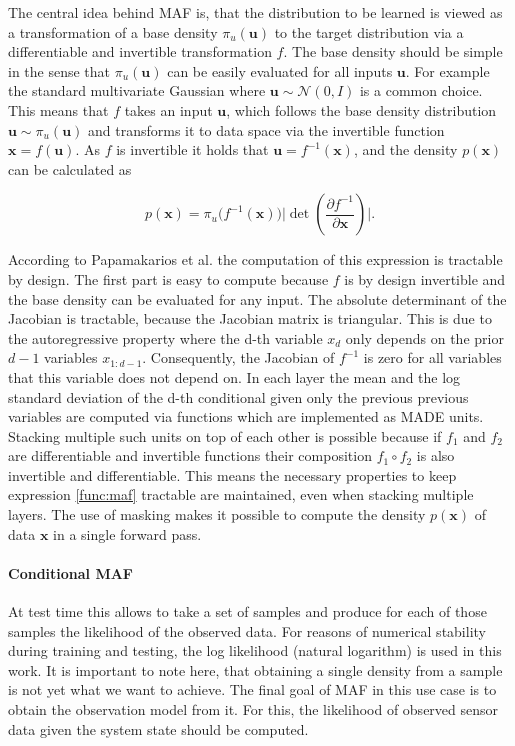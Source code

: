 \documentclass[11pt,titlepage,oneside,openany]{book}
\begin{document}
The central idea behind MAF is, that the distribution to be learned is viewed as a transformation of a base density $\pi_{u} (\pmb{u})$ to the target distribution via a differentiable and invertible transformation $f$. The base density should be simple in the sense that $\pi_{u} (\pmb{u})$ can be easily evaluated for all inputs $\pmb{u}$. For example the standard multivariate Gaussian where $\pmb{u} \sim \mathcal{N}(0, I)$ is a common choice. This means that $f$ takes an input $\pmb{u}$, which follows the base density distribution $\pmb{u} \sim \pi_{u} (\pmb{u})$ and transforms it to data space via the invertible function $\pmb{x}=f(\pmb{u})$. As $f$ is invertible it holds that $\pmb{u} = f^{-1}(\pmb{x})$, and the density $p(\pmb{x})$ can be calculated as

\begin{equation}
	\label{func:maf}
	p(\pmb{x}) = \pi_{u} \bigl(f^{-1}(\pmb{x})\bigr) \biggl\lvert \det \left(\frac{\partial f^{-1}}{\partial \pmb{x}} \right) \biggr\rvert.
\end{equation}

\noindent According to Papamakarios et al. \cite{papamakarios_masked_2017} the computation of this expression is tractable by design. The first part is easy to compute because $f$ is by design invertible and the base density can be evaluated for any input. The absolute determinant of the Jacobian is tractable, because the Jacobian matrix is triangular. This is due to the autoregressive property where the d-th variable $x_d$ only depends on the prior $d-1$ variables $x_{1:d-1}$. Consequently, the Jacobian of $f^{-1}$ is zero for all variables that this variable does not depend on. %
In each layer the mean and the log standard deviation of the d-th conditional given only the previous previous variables are computed via functions which are implemented as MADE units. Stacking multiple such units on top of each other is possible because if $f_1$ and $f_2$ are differentiable and invertible functions their composition $f_1 \circ f_2$ is also invertible and differentiable. This means the necessary properties to keep expression \ref{func:maf} tractable are maintained, even when stacking multiple layers. The use of masking makes it possible to compute the density $p(\pmb{x})$ of data $\pmb{x}$ in a single forward pass.

\paragraph{Conditional MAF}
At test time this allows to take a set of samples and produce for each of those samples the likelihood of the observed data. For reasons of numerical stability during training and testing, the log likelihood (natural logarithm) is used in this work. It is important to note here, that obtaining a single density from a sample is not yet what we want to achieve. The final goal of MAF in this use case is to obtain the observation model from it. For this, the likelihood of observed sensor data given the system state should be computed.
\end{document}
